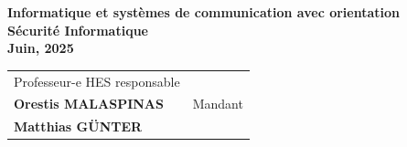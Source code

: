 \begin{titlepage}
\begin{center}
{{				%
				{\large 
				 \fontsize{14pt}{20pt} \textbf{Informatique et systèmes de communication avec orientation\\ Sécurité Informatique }\\[32pt]
				
				\textbf{Juin, 2025}}\\[49pt]
				
				{
					\begin{tabular*}{16cm}{>{\centering}m{7.59cm}>{\centering}m{7.58cm}}
						Professeur-e HES responsable\\[13pt]
						\textbf{  Orestis MALASPINAS }
						&
						Mandant\\[12pt]
						\textbf{ Matthias GÜNTER}
					\end{tabular*}
				}
			}
			\vfill
		}%
	\end{center}
\end{titlepage}
\addtocounter{page}{1}
